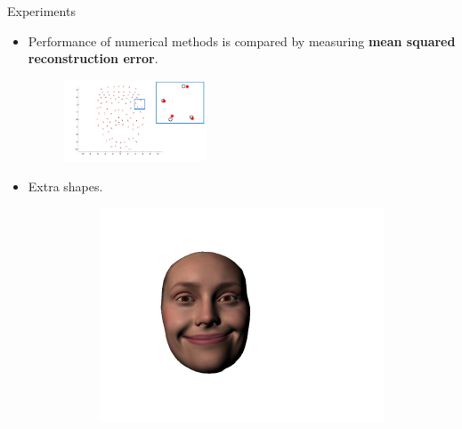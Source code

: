 \documentclass{beamer}
\begin{document}
\begin{frame}{Experiments}
\begin{itemize}
	\item Performance of numerical methods is compared by measuring \textbf{mean squared reconstruction error}.
\begin{figure}
\centering
\includegraphics[width=0.4\textwidth]{img/error2}
\end{figure}
	\item Extra shapes.	\begin{figure}[htbp!]
        \centering
        \begin{subfigure}[b]{0.12\textwidth}
                \includegraphics[trim = 50mm 30mm 80mm 30mm,clip,width=\textwidth]{img/lipcorners15.png}
        \end{subfigure}
        ~ %
        \begin{subfigure}[b]{0.12\textwidth}

\end{subfigure}
\end{figure}
\end{itemize}
\end{frame}
\end{document}

